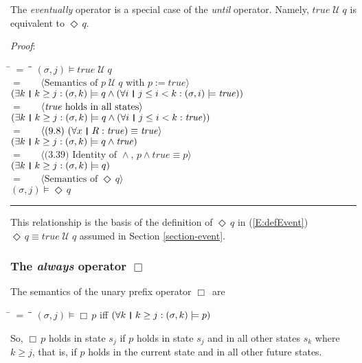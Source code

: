 \documentclass[12pt, fleqn, leqno]{article}
\newcommand{\lgap}{2pt}                             %
\newcommand{\mymathindent}{24pt}                    %
\newcommand{\Until}{\;\mathcal{U}\;}
\newcommand{\Event}{\Diamond\,}
\newcommand{\Always}{\Box\,}
\newcommand{\myqed}{\rule[-.23ex]{1.2ex}{2.0ex}}
\newcommand{\myqedtab}{\hspace{384pt}}              %
\newcommand{\thedr}{\rule[-.25ex]{.32mm}{1.75ex}}   %
\newcommand{\dr}{\;\,\thedr\,\;}                    %
\newcommand{\rb}{:}                                 %
\newcommand{\all}{\forall}                          %
\newcommand{\ext}{\exists}                          %
\newcommand{\Gll} {\langle}                         %
\newcommand{\Ggg} {\rangle}                         %
\newcommand{\Hint}[1]     {\ \ \ $\Gll              \mbox{#1} \Ggg$ }   %
\begin{document}
The \textit{eventually} operator is a special case of the \textit{until} operator.
Namely, $\mathit{true} \Until q$ is equivalent to $\Event q$.

\emph{Proof}:
\begin{tabbing}
\hspace{\mymathindent} \= $= \;$ \= \myqedtab \= \kill
	\> \>   $(\sigma, j) \models \mathit{true}\Until q$\\[\lgap]
	\> $=$  \>  \Hint{Semantics of $p\Until q$ with $p:=\mathit{true}$}\\[\lgap]
	\> \>   $(\ext k \dr k \ge j \rb (\sigma,k) \models q \land (\all i \dr j\le i < k \rb (\sigma,i) \models \mathit{true}))$\\[\lgap]
	\> $=$  \>  \Hint{\textit{true} holds in all states}\\[\lgap]
	\> \>   $(\ext k \dr k \ge j \rb (\sigma,k) \models q \land (\all i \dr j\le i < k \rb \mathit{true}))$\\[\lgap]
	\> $=$  \>  \Hint{(9.8) $(\all x\dr R\rb \mathit{true})\equiv \mathit{true}$}\\[\lgap]
	\> \>   $(\ext k \dr k \ge j \rb (\sigma,k) \models q \land \mathit{true})$\\[\lgap]
	\> $=$  \>  \Hint{(3.39) Identity of $\land$, $p \land \mathit{true} \equiv p$}\\[\lgap]
	\> \>   $(\ext k \dr k \ge j \rb (\sigma,k) \models q)$\\[\lgap]
	\> $=$  \>  \Hint{Semantics of $\Event q$}\\[\lgap]
	\> \>   $(\sigma, j) \models \Event q$ \quad \myqed
\end{tabbing}
This relationship is the basis of the definition of $\Event q$ in (\ref{E:defEvent}) $\Event q \equiv \mathit{true} \Until q$
assumed in Section \ref{section-event}.

\subsubsection*{The \textit{always} operator $\Always$}

The semantics of the unary prefix operator $\Always$ are
\begin{tabbing}
\hspace{\mymathindent} \= $= \;$ \= \myqedtab \= \kill
  \> $(\sigma, j) \models \Always p$ \quad iff \quad $(\all k \dr k \ge j \rb (\sigma,k) \models p)$
\end{tabbing}
So, $\Always p$ holds in state $s_j$ if $p$ holds in state $s_j$ and in all other states $s_k$ where $k\ge j$,
that is, if $p$ holds in the current state and in all other future states.
\end{document}
